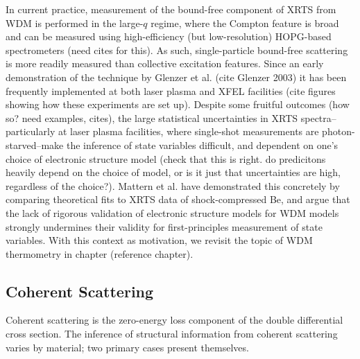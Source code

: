 \documentclass [11pt, proquest, article] {uwthesis}[2016/11/22]
\begin{document}

In current practice, measurement of the  bound-free component of XRTS from WDM is performed in the large-$q$ regime, where the Compton feature is broad and can be measured using high-efficiency (but low-resolution) HOPG-based spectrometers (need cites for this). As such, single-particle bound-free scattering is more readily measured than collective excitation features. Since an early demonstration of the technique by Glenzer et al. (cite Glenzer 2003) it has been frequently implemented at both laser plasma and XFEL facilities (cite figures showing how these experiments are set up). Despite some fruitful outcomes (how so? need examples, cites), the large statistical uncertainties in XRTS spectra--particularly at laser plasma facilities, where single-shot measurements are photon-starved--make the inference of state variables difficult, and dependent on one's choice of electronic structure model (check that this is right. do predicitons heavily depend on the choice of model, or is it just that uncertainties are high, regardless of the choice?). Mattern et al. have demonstrated this concretely by comparing theoretical fits to XRTS data of shock-compressed Be, and argue that the lack of rigorous validation of electronic structure models for WDM models strongly undermines their validity for first-principles measurement of state variables. With this context as motivation, we revisit the topic of WDM thermometry in chapter (reference chapter).

\label{coh}
\subsection{Coherent Scattering}
Coherent scattering is the zero-energy loss component of the double differential cross section.  The inference of structural information from coherent scattering varies by material; two primary cases present themselves.

%
\end{document}
